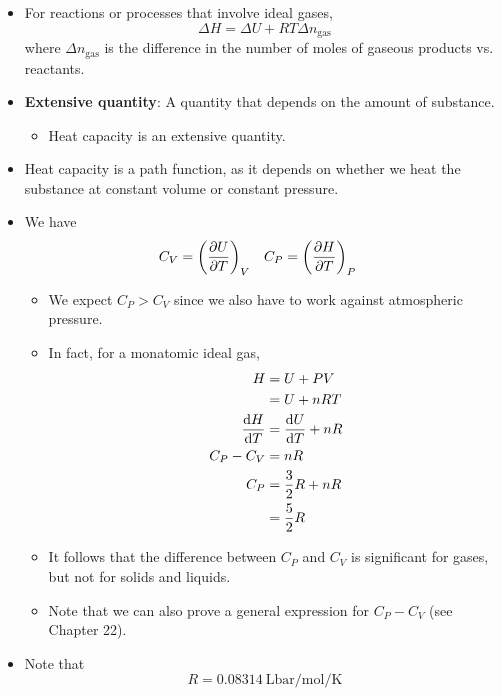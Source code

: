 \documentclass[../notes.tex]{subfiles}
\begin{document}
\begin{itemize}
\begin{itemize}
    \end{itemize}
    \item For reactions or processes that involve ideal gases,
    \begin{equation*}
        \Delta H = \Delta U+RT\Delta n_\text{gas}
    \end{equation*}
    where $\Delta n_\text{gas}$ is the difference in the number of moles of gaseous products vs. reactants.
    \item \textbf{Extensive quantity}: A quantity that depends on the amount of substance.
    \begin{itemize}
        \item Heat capacity is an extensive quantity.
    \end{itemize}
    \item Heat capacity is a path function, as it depends on whether we heat the substance at constant volume or constant pressure.
    \item We have
    \begin{align*}
        C_V &= \left( \pdv{U}{T} \right)_V&
        C_P &= \left( \pdv{H}{T} \right)_P
    \end{align*}
    \begin{itemize}
        \item We expect $C_P>C_V$ since we also have to work against atmospheric pressure.
        \item In fact, for a monatomic ideal gas,
        \begin{align*}
            H &= U+PV\\
            &= U+nRT\\
            \dv{H}{T} &= \dv{U}{T}+nR\\
            C_P-C_V &= nR\\
            C_P &= \frac{3}{2}R+nR\\
            &= \frac{5}{2}R
        \end{align*}
        \item It follows that the difference between $C_P$ and $C_V$ is significant for gases, but not for solids and liquids.
        \item Note that we can also prove a general expression for $C_P-C_V$ (see Chapter 22).
    \end{itemize}
    \item Note that
    \begin{equation*}
        R = \SI[per-mode=fraction]{0.08314}{\liter\bar\per\mole\per\kelvin}
    \end{equation*}

\end{itemize}
\end{document}
